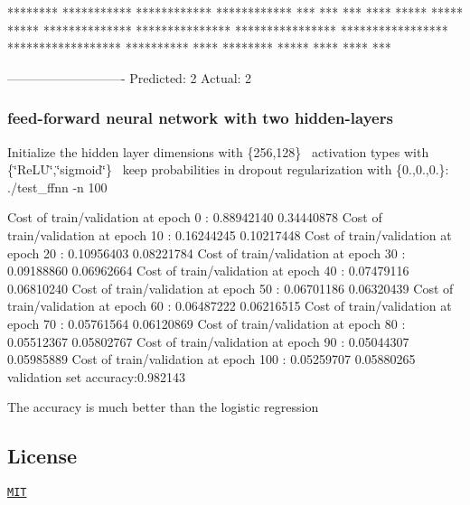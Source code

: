\begin{DoxyPre}{\ttfamily             *********       
           ***********      
           ************     
           ************     
                    ***     
                    ***     
                    ***     
                   ****     
                  *****     
                 *****      
                *****       
      **************        
    ***************         
   ****************         
   *****************        
   ******************       
   **********     ****      
   ********       *****     
    ****           ****     
                    ***}\end{DoxyPre}



\begin{DoxyPre}{\ttfamily ----------------------------
Predicted: 2
Actual: 2}\end{DoxyPre}



\begin{DoxyPre}{\ttfamily }\end{DoxyPre}


\subsubsection*{feed-\/forward neural network with two hidden-\/layers}

Initialize the hidden layer dimensions with \{256,128\}~\newline
 activation types with \{\char`\"{}\+Re\+L\+U\char`\"{},\char`\"{}sigmoid\char`\"{}\}~\newline
 keep probabilities in dropout regularization with \{0.,0.,0.\}\+:~\newline
 ./test\+\_\+ffnn -\/n 100 ~\newline
 
\begin{DoxyPre}{\ttfamily 
Cost of train/validation at epoch    0 :  0.88942140 0.34440878 
Cost of train/validation at epoch   10 :  0.16244245 0.10217448 
Cost of train/validation at epoch   20 :  0.10956403 0.08221784 
Cost of train/validation at epoch   30 :  0.09188860 0.06962664 
Cost of train/validation at epoch   40 :  0.07479116 0.06810240 
Cost of train/validation at epoch   50 :  0.06701186 0.06320439 
Cost of train/validation at epoch   60 :  0.06487222 0.06216515 
Cost of train/validation at epoch   70 :  0.05761564 0.06120869 
Cost of train/validation at epoch   80 :  0.05512367 0.05802767 
Cost of train/validation at epoch   90 :  0.05044307 0.05985889 
Cost of train/validation at epoch  100 :  0.05259707 0.05880265 
validation set accuracy:0.982143
}\end{DoxyPre}
 The accuracy is much better than the logistic regression

\subsection*{License}

\href{https://choosealicense.com/licenses/mit/}{\tt M\+IT} 